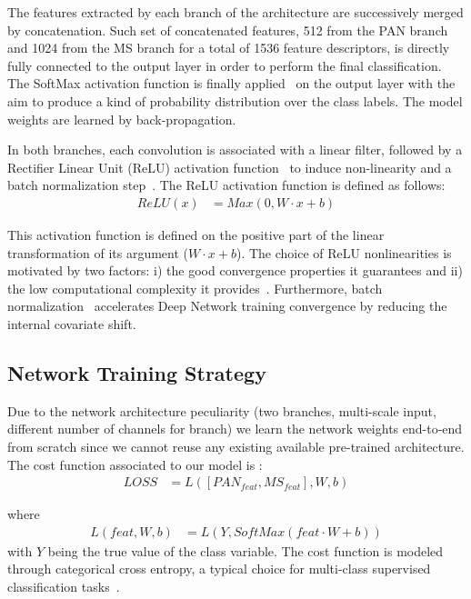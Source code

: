 \documentclass[journal]{IEEEtran}
\begin{document}
The features extracted by each branch of the architecture are successively merged by concatenation. Such set of concatenated features, 512 from the PAN branch and 1024 from the MS branch for a total of 1536 feature descriptors, is directly fully connected to the output layer in order to perform the final classification. The SoftMax activation function is finally applied~\cite{Zhang16} on the output layer with the aim to produce a kind of probability distribution over the class labels. The model weights are learned by back-propagation.


In both branches, each convolution is associated with a linear filter, followed by a Rectifier Linear Unit (ReLU) activation function~\cite{NairH10} to induce non-linearity and a batch normalization step~\cite{IoffeS15}. The ReLU activation function is defined as follows:
\begin{align}
ReLU(x) &= Max(0, W \cdot x + b) \label{eqn:relu}
\end{align}

This activation function is defined on the positive part of the linear transformation of its argument ($W \cdot x + b$).  The choice of ReLU nonlinearities is motivated by two factors: i) the good convergence properties it guarantees and ii) the low computational complexity it provides~\cite{NairH10}. Furthermore, batch normalization~\cite{IoffeS15} accelerates Deep Network training convergence by reducing the internal covariate shift.

\subsection{Network Training Strategy }
Due to the network architecture peculiarity (two branches, multi-scale input, different number of channels for branch) we learn the network weights end-to-end from scratch since we cannot reuse any existing available pre-trained architecture.
The cost function associated to our model is :
\begin{align}
LOSS &= L([PAN_{feat}, MS_{feat}], W, b) \label{eqn:cost}
\end{align}

where
\begin{align}
L(feat, W, b) &= L( Y, SoftMax(feat \cdot W + b)) \nonumber
\end{align}
with $Y$ being the true value of the class variable.
The cost function is modeled through categorical cross entropy, a typical choice for multi-class supervised classification tasks~\cite{IencoGDM17}.
\end{document}
